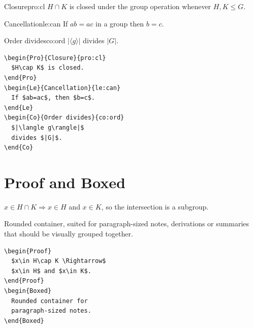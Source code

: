 \begin{fullwidth}
\begin{minipage}[t]{0.48\linewidth}
\begin{Pro}{Closure}{pro:cl}
$H\cap K$ is closed under the group operation whenever $H,K\le G$.
\end{Pro}
\begin{Le}{Cancellation}{le:can}
If $ab=ac$ in a group then $b=c$.
\end{Le}
\begin{Co}{Order divides}{co:ord}
$|\langle g\rangle|$ divides $|G|$.
\end{Co}
\end{minipage}\hfill
\begin{minipage}[t]{0.48\linewidth}
\begin{lstlisting}[language={[LaTeX]TeX}]
\begin{Pro}{Closure}{pro:cl}
  $H\cap K$ is closed.
\end{Pro}
\begin{Le}{Cancellation}{le:can}
  If $ab=ac$, then $b=c$.
\end{Le}
\begin{Co}{Order divides}{co:ord}
  $|\langle g\rangle|$
  divides $|G|$.
\end{Co}
\end{lstlisting}
\end{minipage}
\end{fullwidth}

\section{Proof and Boxed}

\begin{fullwidth}
\begin{minipage}[t]{0.48\linewidth}
\begin{Proof}
$x\in H\cap K \Rightarrow x\in H$ and $x\in K$, so the intersection is a
subgroup.
\end{Proof}
\begin{Boxed}
Rounded container, suited for paragraph-sized notes, derivations
or summaries that should be visually grouped together.
\end{Boxed}
\end{minipage}\hfill
\begin{minipage}[t]{0.48\linewidth}
\begin{lstlisting}[language={[LaTeX]TeX}]
\begin{Proof}
  $x\in H\cap K \Rightarrow$
  $x\in H$ and $x\in K$.
\end{Proof}
\begin{Boxed}
  Rounded container for
  paragraph-sized notes.
\end{Boxed}
\end{lstlisting}
\end{minipage}
\end{fullwidth}

